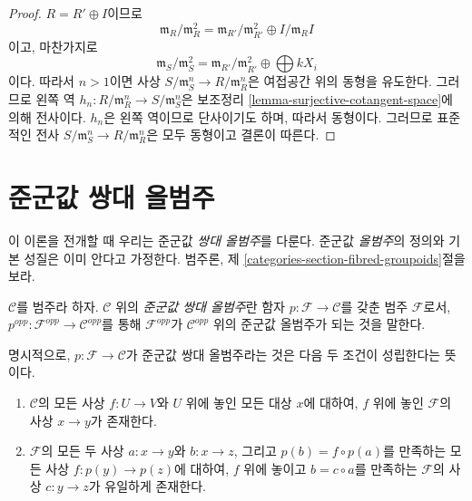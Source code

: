 \begin{proof}
$R = R' \oplus I$이므로
$$
\mathfrak m_R/\mathfrak m_R^2 =
\mathfrak m_{R'}/\mathfrak m_{R'}^2 \oplus I/\mathfrak m_RI
$$
이고, 마찬가지로
$$
\mathfrak m_S/\mathfrak m_S^2 =
\mathfrak m_{R'}/\mathfrak m_{R'}^2 \oplus \bigoplus kX_i
$$
이다. 따라서 $n > 1$이면 사상
$S/\mathfrak m_S^n \to R/\mathfrak m_R^n$은 여접공간 위의 동형을
유도한다. 그러므로 왼쪽 역
$h_n : R/\mathfrak m_R^n \to S/\mathfrak m_S^n$은 보조정리
\ref{lemma-surjective-cotangent-space}에 의해 전사이다.
$h_n$은 왼쪽 역이므로 단사이기도 하며, 따라서 동형이다.
그러므로 표준적인 전사
$S/\mathfrak m_S^n \to R/\mathfrak m_R^n$은 모두 동형이고 결론이 따른다.
\end{proof}

\section{준군값 쌍대 올범주}
\label{section-preliminary}

\noindent
이 이론을 전개할 때 우리는 준군값 {\it 쌍대 올범주}를 다룬다.
준군값 {\it 올범주}의 정의와 기본 성질은 이미 안다고 가정한다.
범주론, 제 \ref{categories-section-fibred-groupoids}절을 보라.

\begin{definition}
\label{definition-category-cofibred-groupoids}
$\mathcal{C}$를 범주라 하자. $\mathcal{C}$ 위의
{\it 준군값 쌍대 올범주}란 함자
$p: \mathcal{F} \to \mathcal{C}$를 갖춘 범주 $\mathcal{F}$로서,
$p^{opp}: \mathcal{F}^{opp} \to \mathcal{C}^{opp}$를 통해
$\mathcal{F}^{opp}$가 $\mathcal{C}^{opp}$ 위의 준군값 올범주가 되는
것을 말한다.
\end{definition}

\noindent
명시적으로, $p: \mathcal{F} \to \mathcal{C}$가 준군값 쌍대
올범주라는 것은 다음 두 조건이 성립한다는 뜻이다.
\begin{enumerate}
\item $\mathcal{C}$의 모든 사상 $f: U \to V$와 $U$ 위에 놓인
모든 대상 $x$에 대하여, $f$ 위에 놓인 $\mathcal{F}$의 사상
$x \to y$가 존재한다.
\item $\mathcal{F}$의 모든 두 사상 $a: x \to y$와 $b: x \to z$,
그리고 $p(b) = f \circ p(a)$를 만족하는 모든 사상
$f: p(y) \to p(z)$에 대하여, $f$ 위에 놓이고
$b = c \circ a$를 만족하는 $\mathcal F$의 사상
$c: y \to z$가 유일하게 존재한다.
\end{enumerate}


